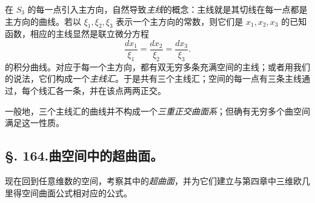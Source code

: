 在 \(S_3\) 的每一点引入主方向，自然导致\emph{主线}的概念：主线就是其切线在每一点都是主方向的曲线。若以 \(\xi_1,\xi_2,\xi_3\) 表示一个主方向的常数，则它们是 \(x_1,x_2,x_3\) 的已知函数，相应的主线显然是联立微分方程
\[
 \frac{dx_1}{\xi_1}=\frac{dx_2}{\xi_2}=\frac{dx_3}{\xi_3}.
\]
的积分曲线。对应于每一个主方向，都有双无穷多条充满空间的主线；或者用我们的说法，它们构成一个\emph{主线汇}。于是共有三个主线汇；空间的每一点有三条主线通过，每个线汇各一条，并在该点两两正交。

一般地，三个主线汇的曲线并不构成一个\emph{三重正交曲面系}；但确有无穷多个曲空间满足这一性质。

\subsection*{\S. 164.\quad 曲空间中的超曲面。}

现在回到任意维数的空间，考察其中的\emph{超曲面}，并为它们建立与第四章中三维欧几里得空间曲面公式相对应的公式。


